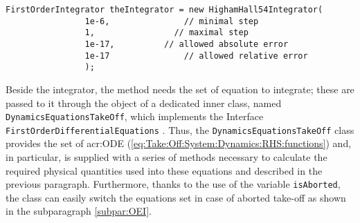 \bigskip
\begin{lstlisting}[caption={HighamHall54Integrator class object creation}, captionpos=b, tabsize=2]
FirstOrderIntegrator theIntegrator = new HighamHall54Integrator(
				1e-6,				// minimal step 
				1,				  // maximal step 
				1e-17,			// allowed absolute error
				1e-17				// allowed relative error
				);
\end{lstlisting}
%
Beside the integrator, the method needs the set of equation to integrate; these are passed to it through the object of a dedicated inner class, named \lstinline[language=Java]!DynamicsEquationsTakeOff!, which implements the \gls{Interface} \lstinline[language=Java]!FirstOrderDifferentialEquations! \cite{apache:FirstOrderDifferentialEquations}. Thus, the \lstinline[language=Java]!DynamicsEquationsTakeOff! class provides the set of \gls{acr:ODE} (\ref{eq:Take:Off:System:Dynamics:RHS:functions}) and, in particular, is supplied with a series of methods necessary to calculate the required physical quantities used into these equations and described in the previous paragraph. Furthermore, thanks to the use of the variable \lstinline[language=Java]!isAborted!, the class can easily switch the equations set in case of aborted take-off as shown in the subparagraph \ref{subpar:OEI}.

